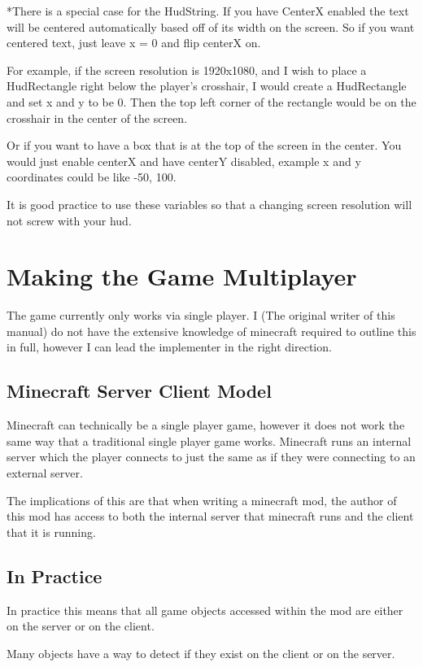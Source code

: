 \documentclass[12pt]{article}
\begin{document}
*There is a special case for the HudString. If you have CenterX enabled the text will be centered automatically based off of its width on the screen. So if you want centered text, just leave x = 0 and flip centerX on.

For example, if the screen resolution is 1920x1080, and I wish to place a HudRectangle right below the player's crosshair, I would create a HudRectangle and set x and y to be 0. Then the top left corner of the rectangle would be on the crosshair in the center of the screen.

Or if you want to have a box that is at the top of the screen in the center. You would just enable centerX and have centerY disabled, example x and y coordinates could be like -50, 100.

It is good practice to use these variables so that a changing screen resolution will not screw with your hud.

\section{Making the Game Multiplayer}
The game currently only works via single player. I (The original writer of this manual) do not have the extensive knowledge of minecraft required to outline this in full, however I can lead the implementer in the right direction.

\subsection{Minecraft Server Client Model}

Minecraft can technically be a single player game, however it does not work the same way that a traditional single player game works. Minecraft runs an internal server which the player connects to just the same as if they were connecting to an external server.

The implications of this are that when writing a minecraft mod, the author of this mod has access to both the internal server that minecraft runs and the client that it is running.

\subsection {In Practice}
In practice this means that all game objects accessed within the mod are either on the server or on the client.

Many objects have a way to detect if they exist on the client or on the server. 
\end{document}
